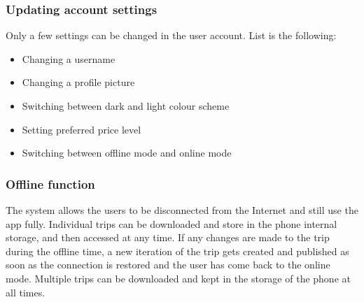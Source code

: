 \subsubsection{Updating account settings}
\hspace{\parindent}Only a few settings can be changed in the user account. List is the following:
\begin{itemize}
\item Changing a username
\item Changing a profile picture
\item Switching between dark and light colour scheme
\item Setting preferred price level
\item Switching between offline mode and online mode
\end{itemize}
\subsubsection{Offline function}
\hspace{\parindent}The system allows the users to be disconnected from the Internet and still use the app fully. Individual trips can be downloaded and store in the phone internal storage, and then accessed at any time. If any changes are made to the trip during the offline time, a new iteration of the trip gets created and published as soon as the connection is restored and the user has come back to the online mode. Multiple trips can be downloaded and kept in the storage of the phone at all times.  


